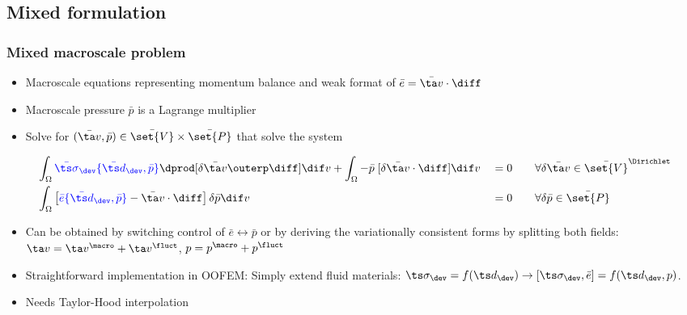 \documentclass[11pt]{beamer} %
\begin{document}
\subsection{Mixed formulation}
\begin{frame}
 \frametitle{Mixed macroscale problem}
\begin{itemize}
 \item Macroscale equations representing momentum balance and weak format of $\bar{e} = \bar{\ta v}\cdot\diff$
 \item Macroscale pressure $\bar{p}$ is a Lagrange multiplier
 \item Solve for $(\bar{\ta v}, \bar{p}) \in \bar{\set{V}}\times\bar{\set{P}}$ that solve the system
\end{itemize}
\begin{alignat*}{3}
 &\int_\Omega {\color{blue}\bar{\ts\sigma}_\dev\{\bar{\ts d}_\dev,\bar{p}\}} \dprod [\delta\bar{\ta v}\outerp \diff] \dif v + \int_\Omega -\bar{p}\;[\delta\bar{\ta v}\cdot\diff]\dif v &&= 0 &\quad& \forall \delta\bar{\ta v}\in \bar{\set{V}}^\Dirichlet\\
 &\int_\Omega \left[ {\color{blue}\bar{e}\{\bar{\ts d}_\dev,\bar{p}\}} - \bar{\ta v}\cdot\diff\right]\delta\bar{p} \dif v &&= 0&\quad& \forall \delta\bar{p}\in \bar{\set{P}}
\end{alignat*}
\begin{itemize}
 \item Can be obtained by switching control of $\bar{e} \leftrightarrow \bar{p}$ or by deriving the variationally consistent forms by splitting both fields:\\ $\ta v = \ta v^\macro + \ta v^\fluct$, $p = p^\macro + p^\fluct$
 \item Straightforward implementation in OOFEM: Simply extend fluid materials: $\ts\sigma_\dev = f(\ts d_\dev) \rightarrow [\ts\sigma_\dev,\bar{e}] = f(\ts d_\dev, p)$.
 \item Needs Taylor-Hood interpolation
\end{itemize}


\end{frame}
\end{document}
